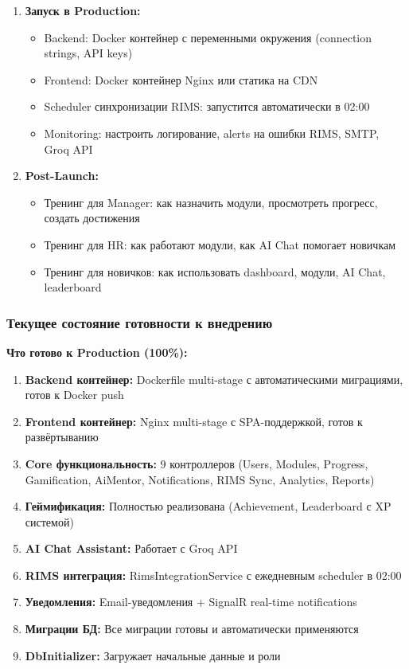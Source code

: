 \begin{enumerate}
	\item \textbf{Запуск в Production:}
	\begin{itemize}
		\item Backend: Docker контейнер с переменными окружения (connection strings, API keys)
		\item Frontend: Docker контейнер Nginx или статика на CDN
		\item Scheduler синхронизации RIMS: запустится автоматически в 02:00
		\item Monitoring: настроить логирование, alerts на ошибки RIMS, SMTP, Groq API
	\end{itemize}
	
	\item \textbf{Post-Launch:}
	\begin{itemize}
		\item Тренинг для Manager: как назначить модули, просмотреть прогресс, создать достижения
		\item Тренинг для HR: как работают модули, как AI Chat помогает новичкам
		\item Тренинг для новичков: как использовать dashboard, модули, AI Chat, leaderboard
	\end{itemize}
\end{enumerate}

\subsubsection*{Текущее состояние готовности к внедрению}

\textbf{Что готово к Production (100\%):}

\begin{enumerate}
	\item \textbf{Backend контейнер:} Dockerfile multi-stage с автоматическими миграциями, готов к Docker push
	\item \textbf{Frontend контейнер:} Nginx multi-stage с SPA-поддержкой, готов к развёртыванию
	\item \textbf{Core функциональность:} 9 контроллеров (Users, Modules, Progress, Gamification, AiMentor, Notifications, RIMS Sync, Analytics, Reports)
	\item \textbf{Геймификация:} Полностью реализована (Achievement, Leaderboard с XP системой)
	\item \textbf{AI Chat Assistant:} Работает с Groq API
	\item \textbf{RIMS интеграция:} RimsIntegrationService с ежедневным scheduler в 02:00
	\item \textbf{Уведомления:} Email-уведомления + SignalR real-time notifications
	\item \textbf{Миграции БД:} Все миграции готовы и автоматически применяются
	\item \textbf{DbInitializer:} Загружает начальные данные и роли
\end{enumerate}

